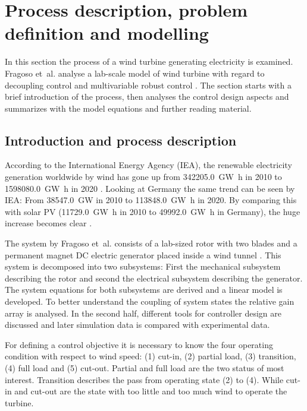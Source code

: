 \section{Process description, problem definition and modelling}

In this section the process of a wind turbine generating electricity is examined.
Fragoso et~al. analyse a lab-scale model of wind turbine with regard to decoupling control and multivariable robust control \cite{Fragoso_et_al_2017}.
The section starts with a brief introduction of the process, then analyses the control design aspects and summarizes with the model equations and further reading material.

\subsection{Introduction and process description}

According to the International Energy Agency (IEA), the renewable electricity generation worldwide by wind has gone up from \SI{342205.0}{\GW\hour} in 2010 to \SI{1598080.0}{\GW\hour} in 2020 \cite{IEA_renewables_wind_world_2022}. 
Looking at Germany the same trend can be seen by IEA: From \SI{38547.0}{\GW} in 2010 to  \SI{113848.0}{\GW\hour} in 2020. 
By comparing this with solar PV (\SI{11729.0}{\GW\hour} in 2010 to \SI{49992.0}{\GW\hour} in Germany), the huge increase becomes clear \cite{IEA_renewables_wind_world_2022}. 

The system by Fragoso et~al. consists of a lab-sized rotor with two blades and a permanent magnet DC electric generator placed inside a wind tunnel \cite{Fragoso_et_al_2017}.
This system is decomposed into two subsystems: First the mechanical subsystem describing the rotor and second the electrical subsystem describing the generator.
The system equations for both subsystems are derived and a linear model is developed.
To better understand the coupling of system states the relative gain array is analysed.
In the second half, different tools for controller design are discussed and later simulation data is compared with experimental data.

For defining a control objective it is necessary to know the four operating condition with respect to wind speed: (1) cut-in, (2) partial load, (3) transition,  (4) full load and (5) cut-out.
Partial and full load are the two status of most interest.
Transition describes the pass from operating state (2) to (4).
While cut-in and cut-out are the state with too little and too much wind to operate the turbine.


